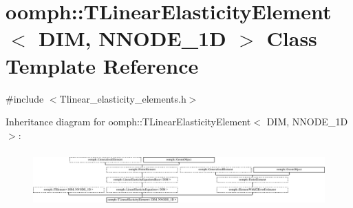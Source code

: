 \hypertarget{classoomph_1_1TLinearElasticityElement}{}\section{oomph\+:\+:T\+Linear\+Elasticity\+Element$<$ D\+IM, N\+N\+O\+D\+E\+\_\+1D $>$ Class Template Reference}
\label{classoomph_1_1TLinearElasticityElement}


{\ttfamily \#include $<$Tlinear\+\_\+elasticity\+\_\+elements.\+h$>$}

Inheritance diagram for oomph\+:\+:T\+Linear\+Elasticity\+Element$<$ D\+IM, N\+N\+O\+D\+E\+\_\+1D $>$\+:\begin{figure}[H]
\begin{center}
\leavevmode
\includegraphics[height=2.160494cm]{classoomph_1_1TLinearElasticityElement}
\end{center}
\end{figure}
